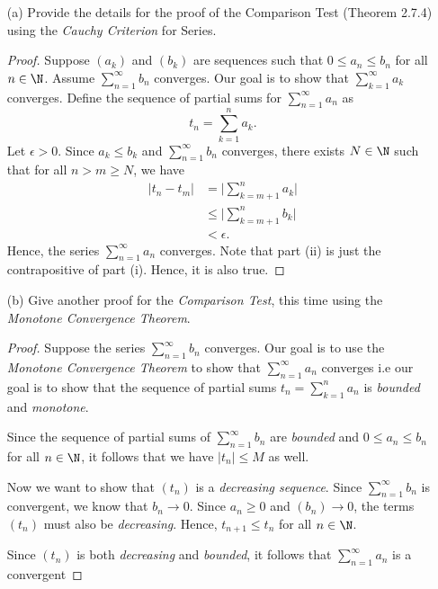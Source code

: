 \begin{enumerate}
    \item[(a)] Provide the details for the proof of the Comparison Test (Theorem 2.7.4) using the \textit{Cauchy Criterion} for Series.
        \begin{proof}
        Suppose \( (a_k)\) and \( (b_k)\) are sequences such that \( 0 \leq a_n \leq b_n\) for all \( n \in \N \). Assume \( \sum_{n=1}^{\infty} b_n \) converges. Our goal is to show that \( \sum_{k=1}^{\infty} a_k \) converges. Define the sequence of partial sums for \( \sum_{n=1}^{\infty}a_n\) as 
        \[ t_n = \sum_{k=1}^{n}a_k.\]
        Let \(\epsilon > 0 \). Since \( a_k \leq b_k \) and \( \sum_{n=1}^{\infty}b_n\) converges, there exists \( N \in \N \) such that for all \( n > m \geq N \), we have  
        \begin{align*}
             |t_n - t_m |&= \Big|\sum_{k=m+1}^{n} a_k\Big| \\
                         &\leq \Big|\sum_{k=m+1}^{n} b_k \Big| \\
                         &< \epsilon.
        \end{align*}
        Hence, the series \( \sum_{n=1}^{\infty} a_n \) converges. Note that part (ii) is just the contrapositive of part (i). Hence, it is also true.
        \end{proof}
    \item[(b)] Give another proof for the \textit{Comparison Test}, this time using the \textit{Monotone Convergence Theorem}.
        \begin{proof}
        Suppose the series \( \sum_{n=1}^{\infty} b_n \) converges. Our goal is to use the \textit{Monotone Convergence Theorem} to show that \( \sum_{n=1}^{\infty} a_n \) converges i.e our goal is to show that the sequence of partial sums \( t_n = \sum_{k=1}^{n} a_n \) is \textit{bounded} and \textit{monotone}. 

        Since the sequence of partial sums of \( \sum_{n=1}^{\infty} b_n \) are \textit{bounded} and \( 0 \leq a_n \leq b_n \) for all \( n \in \N \), it follows that we have \( |t_n| \leq M  \) as well. 

        Now we want to show that \( (t_n )\) is a \textit{decreasing sequence}. Since \( \sum_{n=1}^{\infty} b_n \) is convergent, we know that \( b_n \to  0 \). Since \( a_n \geq 0 \) and \( (b_n) \to 0 \), the terms \( (t_n)\) must also be \textit{decreasing}. Hence, \( t_{n+1} \leq t_n \) for all \( n \in \N \).
        
        Since \( (t_n)\) is both \textit{decreasing} and \textit{bounded}, it follows that \( \sum_{n=1}^{\infty} a_n \) is a convergent
        \end{proof}
\end{enumerate}

